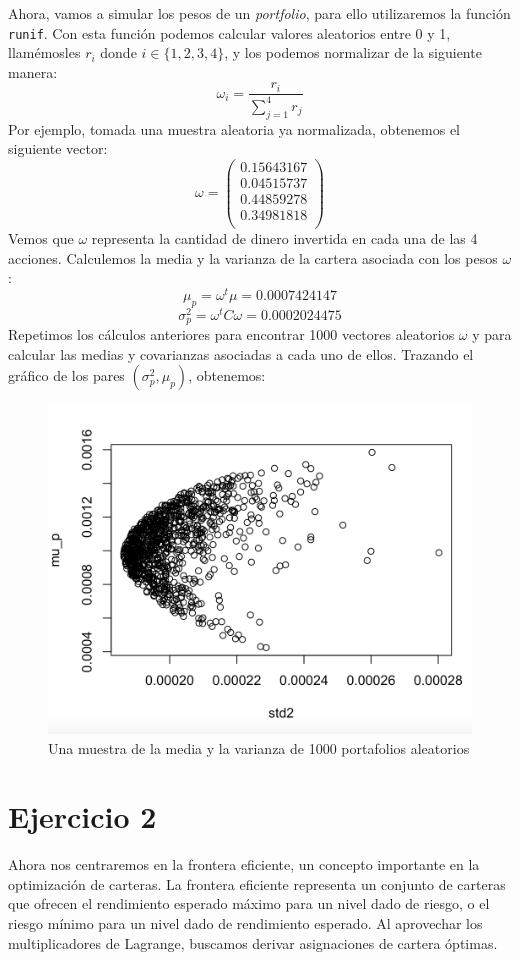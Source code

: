 \documentclass[a4paper,]{article}
\begin{document}
Ahora, vamos a simular los pesos de un \textit{portfolio}, para ello utilizaremos la función \texttt{runif}. Con esta función podemos calcular valores aleatorios entre 0 y 1, llamémosles $r_i$ donde $i\in\{1,2,3,4\}$, y los podemos normalizar de la  siguiente manera:
$$\omega _i=\frac{r_i}{\sum_{j=1}^{4}r_j}$$
Por ejemplo, tomada una muestra aleatoria ya normalizada, obtenemos el siguiente vector:
$$\omega=\begin{pmatrix}
0.15643167 \\ 0.04515737 \\ 0.44859278 \\ 0.34981818 \\
\end{pmatrix}$$
Vemos que $\omega$ representa la cantidad de dinero invertida en cada una de las 4 acciones. Calculemos la media y la varianza de la cartera asociada con los pesos $\omega$:
$$\mu_p=\omega^{t}\mu=0.0007424147$$
$$\sigma^2_p=\omega^{t}C\omega=0.0002024475$$
Repetimos los cálculos anteriores para encontrar 1000 vectores aleatorios $\omega$ y para calcular las medias y covarianzas asociadas a cada uno de ellos. Trazando el gráfico de los pares $(\sigma^2_p,\mu_p)$, obtenemos:
\begin{figure}[H]
    \centering
    \includegraphics[width=0.7\linewidth]{ex1.png} 
    \caption*{Una muestra de la media y la varianza de 1000 portafolios aleatorios}
\end{figure}


\section*{Ejercicio 2}
Ahora nos centraremos en la frontera eficiente, un concepto importante en la optimización de carteras. La frontera eficiente representa un conjunto de carteras que ofrecen el rendimiento esperado máximo para un nivel dado de riesgo, o el riesgo mínimo para un nivel dado de rendimiento esperado. Al aprovechar los multiplicadores de Lagrange, buscamos derivar asignaciones de cartera óptimas.\\
\end{document}
